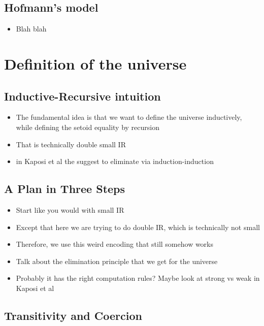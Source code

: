 \documentclass[acmsmall,screen,review]{acmart}
\begin{document}
\subsection{Hofmann's model}

\begin{itemize}
\item Blah blah
\end{itemize}

\section{Definition of the universe}

\subsection{Inductive-Recursive intuition}

\begin{itemize}
\item The fundamental idea is that we want to define the universe inductively, while defining the setoid equality by recursion
\item That is technically double small IR
\item in Kaposi et al the suggest to eliminate via induction-induction
\end{itemize}

\subsection{A Plan in Three Steps}

\begin{itemize}
\item Start like you would with small IR
\item Except that here we are trying to do double IR, which is technically not small
\item Therefore, we use this weird encoding that still somehow works
\item Talk about the elimination principle that we get for the universe
\item Probably it has the right computation rules? Maybe look at strong vs weak in Kaposi et al
\end{itemize}

\subsection{Transitivity and Coercion}
\end{document}
